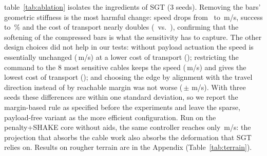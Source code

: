 table~\ref{tab:ablation} isolates the ingredients of SGT (3 seeds).
Removing the bars' geometric stiffness is the most harmful change:
speed drops from \aFullSpeed\ to \aNoGeoSpeed\,m/s, success to
\aNoGeoSuccess\,\% and the cost of transport nearly doubles
(\aNoGeoCot\ vs.\ \aFullCot), confirming that the softening of the
compressed bars is what the sensitivity has to capture. The other design
choices did not help in our tests: without payload actuation the speed
is essentially unchanged (\aNoPayloadSpeed\,m/s) at a lower cost of
transport (\aNoPayloadCot); restricting the command to the 8 most
sensitive cables keeps the speed (\aSparseSpeed\,m/s) and gives the
lowest cost of transport (\aSparseCot); and choosing the edge by
alignment with the travel direction instead of by reachable margin was
not worse (\aNoFeasSpeed\,$\pm$\,\aNoFeasSpeedStd\,m/s). With three
seeds these differences are within one standard deviation, so we report
the margin-based rule as specified before the experiments and leave the
sparse, payload-free variant as the more efficient configuration. Run
on the penalty+SHAKE core without aids, the same controller reaches only
\aLegacySpeed\,m/s: the projection that absorbs the cable work also
absorbs the deformation that SGT relies on. Results on rougher
terrain are in the Appendix (Table~\ref{tab:terrain}).
